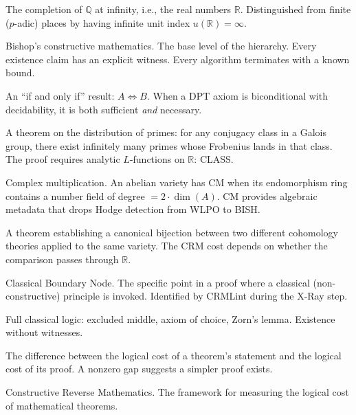 \documentclass[11pt,twoside,openany]{report}
\theoremstyle{remark}
\newcommand{\BISH}{\textsf{BISH}}
\newcommand{\WLPO}{\textsf{WLPO}}
\newcommand{\CLASS}{\textsf{CLASS}}
\begin{document}
\begin{description}[style=nextline, leftmargin=2.5cm, labelwidth=2.3cm]

\item[Archimedean place] The completion of $\mathbb{Q}$ at infinity, i.e., the real numbers $\mathbb{R}$. Distinguished from finite ($p$-adic) places by having infinite unit index $u(\mathbb{R}) = \infty$.

\item[\BISH] Bishop's constructive mathematics. The base level of the hierarchy. Every existence claim has an explicit witness. Every algorithm terminates with a known bound.

\item[Biconditional] An ``if and only if'' result: $A \Leftrightarrow B$. When a DPT axiom is biconditional with decidability, it is both sufficient \emph{and} necessary.

\item[Chebotarev density] A theorem on the distribution of primes: for any conjugacy class in a Galois group, there exist infinitely many primes whose Frobenius lands in that class. The proof requires analytic $L$-functions on $\mathbb{R}$: \CLASS.

\item[CM] Complex multiplication. An abelian variety has CM when its endomorphism ring contains a number field of degree $= 2 \cdot \dim(A)$. CM provides algebraic metadata that drops Hodge detection from \WLPO{} to \BISH.

\item[Comparison isomorphism] A theorem establishing a canonical bijection between two different cohomology theories applied to the same variety. The CRM cost depends on whether the comparison passes through $\mathbb{R}$.

\item[CBN] Classical Boundary Node. The specific point in a proof where a classical (non-constructive) principle is invoked. Identified by CRMLint during the X-Ray step.

\item[\CLASS] Full classical logic: excluded middle, axiom of choice, Zorn's lemma. Existence without witnesses.

\item[Conservation gap] The difference between the logical cost of a theorem's statement and the logical cost of its proof. A nonzero gap suggests a simpler proof exists.

\item[CRM] Constructive Reverse Mathematics. The framework for measuring the logical cost of mathematical theorems.


\end{description}
\end{document}
